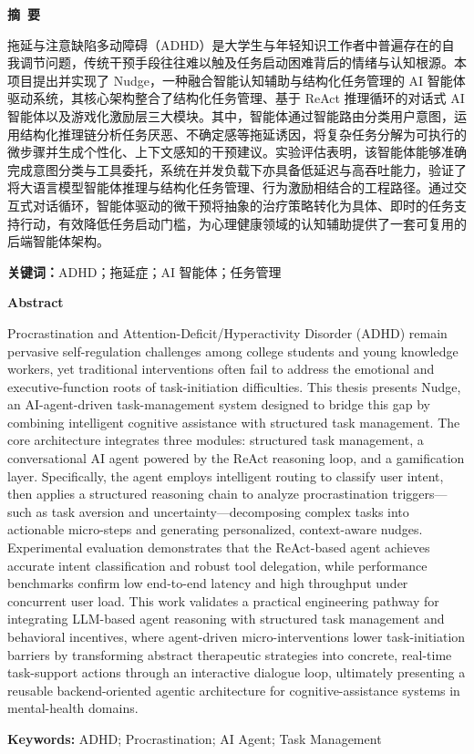 \cleardoublepage{}
\begin{center}
    \bfseries {} 摘~要
\end{center}

拖延与注意缺陷多动障碍（ADHD）是大学生与年轻知识工作者中普遍存在的自我调节问题，传统干预手段往往难以触及任务启动困难背后的情绪与认知根源。本项目提出并实现了 Nudge，一种融合智能认知辅助与结构化任务管理的 AI 智能体驱动系统，其核心架构整合了结构化任务管理、基于 ReAct 推理循环的对话式 AI 智能体以及游戏化激励层三大模块。其中，智能体通过智能路由分类用户意图，运用结构化推理链分析任务厌恶、不确定感等拖延诱因，将复杂任务分解为可执行的微步骤并生成个性化、上下文感知的干预建议。实验评估表明，该智能体能够准确完成意图分类与工具委托，系统在并发负载下亦具备低延迟与高吞吐能力，验证了将大语言模型智能体推理与结构化任务管理、行为激励相结合的工程路径。通过交互式对话循环，智能体驱动的微干预将抽象的治疗策略转化为具体、即时的任务支持行动，有效降低任务启动门槛，为心理健康领域的认知辅助提供了一套可复用的后端智能体架构。

\vskip 21pt
\noindent\textbf{关键词：}ADHD；拖延症；AI 智能体；任务管理


\cleardoublepage{}
\begin{center}
    \bfseries {} Abstract
\end{center}

Procrastination and Attention-Deficit/Hyperactivity Disorder (ADHD) remain pervasive self-regulation challenges among college students and young knowledge workers, yet traditional interventions often fail to address the emotional and executive-function roots of task-initiation difficulties. This thesis presents Nudge, an AI-agent-driven task-management system designed to bridge this gap by combining intelligent cognitive assistance with structured task management. The core architecture integrates three modules: structured task management, a conversational AI agent powered by the ReAct reasoning loop, and a gamification layer. Specifically, the agent employs intelligent routing to classify user intent, then applies a structured reasoning chain to analyze procrastination triggers---such as task aversion and uncertainty---decomposing complex tasks into actionable micro-steps and generating personalized, context-aware nudges. Experimental evaluation demonstrates that the ReAct-based agent achieves accurate intent classification and robust tool delegation, while performance benchmarks confirm low end-to-end latency and high throughput under concurrent user load. This work validates a practical engineering pathway for integrating LLM-based agent reasoning with structured task management and behavioral incentives, where agent-driven micro-interventions lower task-initiation barriers by transforming abstract therapeutic strategies into concrete, real-time task-support actions through an interactive dialogue loop, ultimately presenting a reusable backend-oriented agentic architecture for cognitive-assistance systems in mental-health domains.

\vskip 21pt
\noindent\textbf{Keywords: }ADHD; Procrastination; AI Agent; Task Management